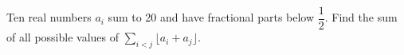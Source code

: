 Ten real numbers $ a_i $ sum to 20 and have fractional parts below $\dfrac{1}{2}$. Find the sum of all possible values of $\sum_{i<j}\lfloor a_i+a_j\rfloor $.
